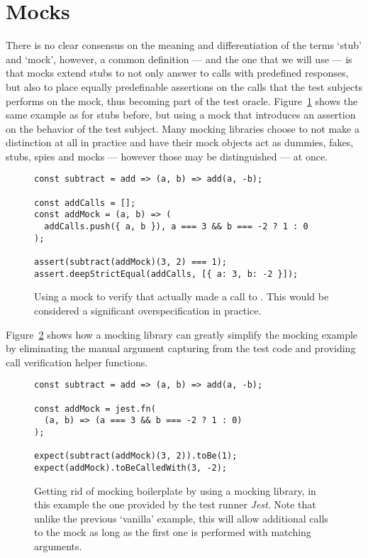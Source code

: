 \section{Mocks}
There is no clear consensus on the meaning and differentiation
of the terms `stub' and `mock', however, a common definition
--- and the one that we will use ---
is that mocks extend stubs to
not only answer to calls with predefined responses,
but also to place equally predefinable assertions on
the calls that the test subjects performs on the mock,
\autocite{MocksArentStubs}
thus becoming part of the test oracle.
Figure~\ref{fig:Mock} shows the same example as for stubs before,
but using a mock that introduces an assertion
on the behavior of the test subject.
Many mocking libraries choose to
not make a distinction at all in practice
and have their mock objects act as
dummies, fakes, stubs, spies and mocks
--- however those may be distinguished --- at once.
\autocite{SpockFrameworkDoc}\autocite{JestMockFunctions}

\begin{figure}
  \begin{verbatim}
const subtract = add => (a, b) => add(a, -b);

const addCalls = [];
const addMock = (a, b) => (
  addCalls.push({ a, b }), a === 3 && b === -2 ? 1 : 0
);

assert(subtract(addMock)(3, 2) === 1);
assert.deepStrictEqual(addCalls, [{ a: 3, b: -2 }]);
  \end{verbatim}
  \caption{
    Using a mock to verify that 
    actually made a call to .
    This would be considered a significant overspecification in practice.
  }\label{fig:Mock}
\end{figure}

Figure~\ref{fig:MockLibrary} shows how a mocking library
can greatly simplify the mocking example
by eliminating the manual argument capturing from the test code
and providing call verification helper functions.

\begin{figure}
  \begin{verbatim}
const subtract = add => (a, b) => add(a, -b);

const addMock = jest.fn(
  (a, b) => (a === 3 && b === -2 ? 1 : 0)
);

expect(subtract(addMock)(3, 2)).toBe(1);
expect(addMock).toBeCalledWith(3, -2);
  \end{verbatim}
  \caption{
    Getting rid of mocking boilerplate by using a mocking library,
    in this example the one provided by the test runner \textit{Jest}.
    \autocite{JestGithub}
    Note that unlike the previous `vanilla' example,
    this will allow additional calls to the mock
    as long as the first one is performed with matching arguments.
  }\label{fig:MockLibrary}
\end{figure}
